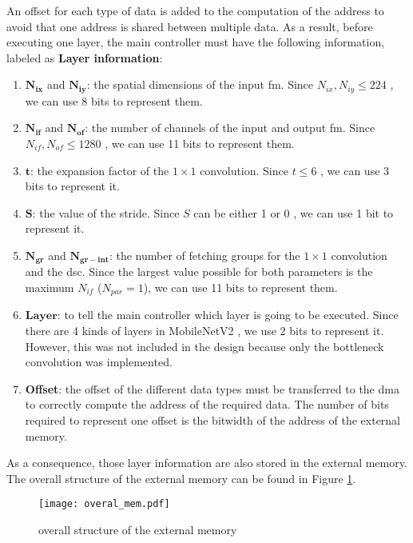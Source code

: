 An offset for each type of data is added to the computation of the address to avoid that one address is shared between multiple data. As a result, before executing one layer, the main controller must have the following information, labeled as \textbf{Layer information}:
%
\begin{enumerate}
    \item $\boldsymbol{N_{ix}}$ and $\boldsymbol{N_{iy}}$: the spatial dimensions of the input \acrshort{fm}. Since $N_{ix}, N_{iy} \leq 224$ \cite{sandler_mobilenetv2_2018}, we can use 8 bits to represent them.
    \item $\boldsymbol{N_{if}}$ and $\boldsymbol{N_{of}}$: the number of channels of the input  and output \acrshort{fm}. Since $N_{if}, N_{of} \leq 1280$ \cite{sandler_mobilenetv2_2018}, we can use 11 bits to represent them.
    \item $\boldsymbol{t}$: the expansion factor of the $1 \times 1$ convolution. Since $t \leq 6$ \cite{sandler_mobilenetv2_2018}, we can use 3 bits to represent it.
    \item $\boldsymbol{S}$: the value of the stride. Since $S$ can be either 1 or 0 \cite{sandler_mobilenetv2_2018}, we can use 1 bit to represent it.
    \item $\boldsymbol{N_{gr}}$ and $\boldsymbol{N_{gr-int}}$: the number of fetching groups for the $1 \times 1$ convolution and the \acrshort{dsc}. Since the largest value possible for both parameters is the maximum $N_{if}$ ($N_{par} = 1$), we can use 11 bits to represent them.
    \item $\boldsymbol{Layer}$: to tell the main controller which layer is going to be executed. Since there are 4 kinds of layers in MobileNetV2 \cite{sandler_mobilenetv2_2018}, we use 2 bits to represent it. However, this was not included in the design because only the bottleneck convolution was implemented.
    \item \textbf{Offset}: the offset of the different data types must be transferred to the \acrshort{dma} to correctly compute the address of the required data. The number of bits required to represent one offset is the bitwidth of the address of the external memory.
\end{enumerate}
%
As a consequence, those layer information are also stored in the external memory. The overall structure of the external memory can be found in Figure \ref{fig:overal_mem}.
%
\begin{figure}[H]
    \centering
    \texttt{[image: overal\_mem.pdf]}
    \caption{overall structure of the external memory}
    \label{fig:overal_mem}
\end{figure}
